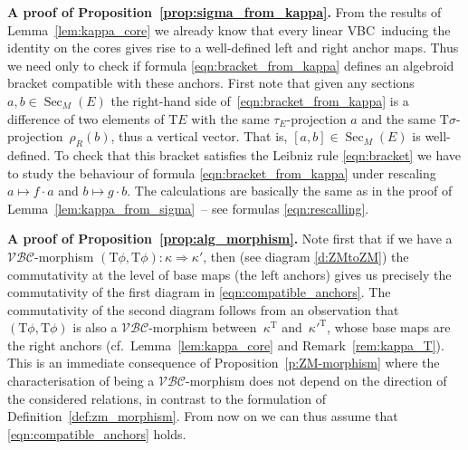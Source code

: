 \documentclass[pdftex]{sigma}
\newcommand{\ZM}{{VBC}} %
\newcommand{\Sec}{\operatorname{Sec}}
\newcommand{\mZM}{\Rightarrow}
\newcommand{\rhoR}{\rho_R}
\newcommand{\T}{\mathrm{T}} %
\newcommand{\catZM}{{\mathcal{VBC}}} %
\numberwithin{equation}{section}
\theoremstyle{definition}
\begin{document}
{\bf A proof of Proposition~\ref{prop:sigma_from_kappa}.} %
From the results of Lemma~\ref{lem:kappa_core} we already know that every linear \ZM\ inducing the identity on the cores gives rise to a well-defined left and right anchor maps. Thus we need only to check if formula \eqref{eqn:bracket_from_kappa} defines an algebroid bracket compatible with these anchors. First note that given any sections $a,b\in \Sec_M(E)$ the right-hand side of~\eqref{eqn:bracket_from_kappa} is a difference of two elements of $\T E$ with the same $\tau_E$-projection $a$ and the same $\T\sigma$-projection~$\rhoR(b)$, thus a vertical vector. That is, $[a,b]\in\Sec_M(E)$ is well-defined. To check that this bracket satisfies the Leibniz rule \eqref{eqn:bracket} we have to study the behaviour of formula \eqref{eqn:bracket_from_kappa} under rescaling $a\mapsto f\cdot a$ and $b\mapsto g\cdot b$. The calculations are basically the same as in the proof of Lemma~\ref{lem:kappa_from_sigma}~-- see formulas \eqref{eqn:rescalling}. %

{\bf A proof of Proposition~\ref{prop:alg_morphism}.} %
Note first that if we have a $\catZM$-morphism \mbox{$(\T \phi,\T\phi)\colon \kappa\mZM\kappa'$}, then (see diagram \eqref{d:ZMtoZM}) the commutativity at the level of base maps (the left anchors) gives us precisely the commutativity of the first diagram in \eqref{eqn:compatible_anchors}. The commutativity of the se\-cond diagram follows from an observation that $(\T \phi,\T\phi)$ is also a $\catZM$-morphism between~$\kappa^\T$ and~${\kappa'}^\T$, whose base maps are the right anchors (cf.\ Lemma~\ref{lem:kappa_core} and Remark~\ref{rem:kappa_T}). This is an immediate consequence of Proposition~\ref{p:ZM-morphism} where the characterisation of being a $\catZM$-morphism does not depend on the direction of the considered relations, in contrast to the formulation of Definition~\ref{def:zm_morphism}. From now on we can thus assume that \eqref{eqn:compatible_anchors} holds.
\end{document}
